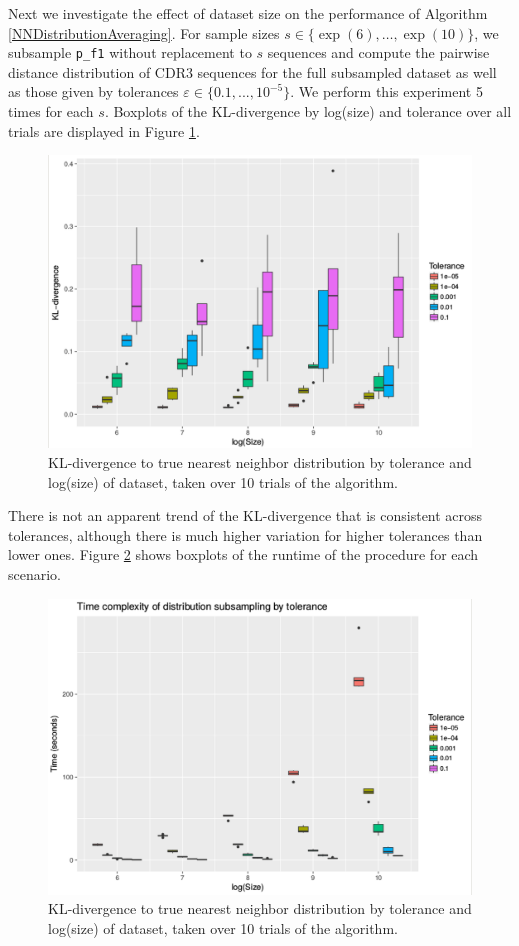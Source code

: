 \documentclass{article}
\begin{document}
Next we investigate the effect of dataset size on the performance of Algorithm \ref{NNDistributionAveraging}.
For sample sizes $s \in \{\exp(6), \dots, \exp(10)\}$, we subsample \texttt{p\_f1} without replacement to $s$ sequences and compute the pairwise distance distribution of CDR3 sequences for the full subsampled dataset as well as those given by tolerances $\varepsilon \in \{0.1, ..., 10^{-5}\}$.  
We perform this experiment 5 times for each $s$.
Boxplots of the KL-divergence by log(size) and tolerance over all trials are displayed in Figure \ref{fig:DivBySize}.  
\begin{figure}
    \includegraphics[width=\linewidth]{Figures/NearestNeighbor/div_by_size_and_tol_cdr3.png}
    \caption{KL-divergence to true nearest neighbor distribution by tolerance and log(size) of dataset, taken over 10 trials of the algorithm.}
    \label{fig:DivBySize}
\end{figure}
There is not an apparent trend of the KL-divergence that is consistent across tolerances, although there is much higher variation for higher tolerances than lower ones.
Figure \ref{fig:TimeBySize} shows boxplots of the runtime of the procedure for each scenario.
\begin{figure}
    \includegraphics[width=\linewidth]{Figures/NearestNeighbor/time_by_size_and_tol_cdr3.png}
    \caption{KL-divergence to true nearest neighbor distribution by tolerance and log(size) of dataset, taken over 10 trials of the algorithm.}
    \label{fig:TimeBySize}
\end{figure}
\end{document}
